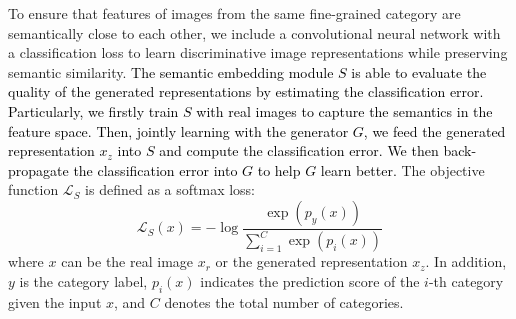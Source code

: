 \documentclass[runningheads]{llncs}
\begin{document}
To ensure that features of images from the same fine-grained category are semantically close to each other, we include a convolutional neural network with a classification loss to learn discriminative image representations while preserving semantic similarity.
\textcolor{black}{The semantic embedding module $S$ is able to evaluate the quality of the generated representations by estimating the classification error. Particularly, we firstly train $S$ with real images to capture the semantics in the feature space. Then, jointly learning with the generator $G$, we feed the generated representation $x_z$ into $S$ and compute the classification error. We then back-propagate the classification error into $G$ to help $G$ learn better.
} 
The objective function $\mathcal{L}_S$ is defined as a softmax loss: 
\begin{equation}
    \mathcal{L}_S(x) = -\log \frac{\exp(p_y(x))}{\sum_{i=1}^{C} \exp(p_i(x))}
    \label{eq:s}
\end{equation}
where $x$ can be the real image $x_r$ or the generated representation $x_z$. In addition, $y$ is the category label, $p_i(x)$ indicates the prediction score of the $i$-th category given the input $x$, and $C$ denotes the total number of categories.
\end{document}
